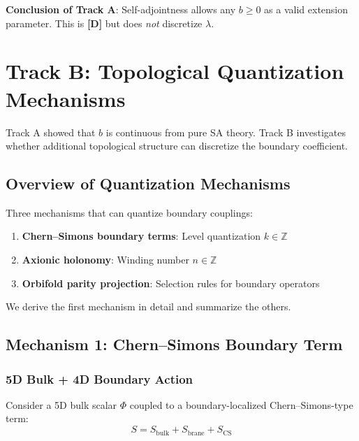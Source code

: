 \documentclass[11pt,a4paper]{article}
\newcommand{\tagD}{\textbf{[D]}}
\theoremstyle{definition}
\theoremstyle{plain}
\theoremstyle{remark}
\begin{document}
\textbf{Conclusion of Track A}: Self-adjointness allows any $b \geq 0$ as a valid
extension parameter. This is \tagD{} but does \emph{not} discretize $\lambda$.

\section{Track B: Topological Quantization Mechanisms}
\label{sec:track-b}

Track A showed that $b$ is continuous from pure SA theory. Track B investigates
whether additional topological structure can discretize the boundary coefficient.

\subsection{Overview of Quantization Mechanisms}

Three mechanisms that can quantize boundary couplings:

\begin{enumerate}
\item \textbf{Chern--Simons boundary terms}: Level quantization $k \in \mathbb{Z}$
\item \textbf{Axionic holonomy}: Winding number $n \in \mathbb{Z}$
\item \textbf{Orbifold parity projection}: Selection rules for boundary operators
\end{enumerate}

We derive the first mechanism in detail and summarize the others.

\subsection{Mechanism 1: Chern--Simons Boundary Term}

\subsubsection{5D Bulk + 4D Boundary Action}

Consider a 5D bulk scalar $\Phi$ coupled to a boundary-localized Chern--Simons-type term:
\begin{equation}
S = S_{\mathrm{bulk}} + S_{\mathrm{brane}} + S_{\mathrm{CS}}
\label{eq:total-action-cs}
\end{equation}
\end{document}
